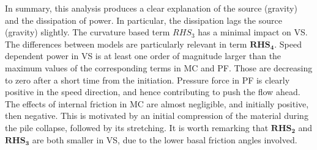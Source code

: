 \documentclass{article}
\begin{document}
In summary, this analysis produces a clear explanation of the source (gravity) and the dissipation of power. In particular, the dissipation lags the source (gravity) slightly. The curvature based term $RHS_3$ has a minimal impact on VS. The differences between models are particularly relevant in term  $\boldsymbol{RHS_4}$. Speed dependent power in VS is at least one order of magnitude larger than the maximum values of the corresponding terms in MC and PF. Those are decreasing to zero after a short time from the initiation. Pressure force in PF is clearly positive in the speed direction, and hence contributing to push the flow ahead. The effects of internal friction in MC are almost negligible, and initially positive, then negative. This is motivated by an initial compression of the material during the pile collapse, followed by its stretching. It is worth remarking that $\boldsymbol{RHS_2}$ and $\boldsymbol{RHS_3}$ are both smaller in VS, due to the lower basal friction angles involved.
\end{document}
